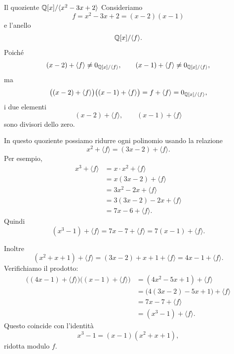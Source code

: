 \documentclass[a4paper]{article}
\begin{document}
\begin{radioactive}
\begin{snippetexample}{Il quoziente \(\mathbb{Q}[x]/\langle x^2-3x+2 \rangle\)}
    Consideriamo
    \[
        f=x^2-3x+2=(x-2)(x-1)
    \]
    e l'anello
    \[
        \mathbb{Q}[x]/\langle f \rangle.
    \]
    Poiché
    \[
        (x-2)+\langle f \rangle\neq 0_{\mathbb{Q}[x]/\langle f \rangle},
        \qquad
        (x-1)+\langle f \rangle\neq 0_{\mathbb{Q}[x]/\langle f \rangle},
    \]
    ma
    \[
        \big((x-2)+\langle f \rangle\big)\big((x-1)+\langle f \rangle\big)
        =
        f+\langle f \rangle
        =
        0_{\mathbb{Q}[x]/\langle f \rangle},
    \]
    i due elementi
    \[
        (x-2)+\langle f \rangle,
        \qquad
        (x-1)+\langle f \rangle
    \]
    sono divisori dello zero.

    In questo quoziente possiamo ridurre ogni polinomio usando la relazione
    \[
        x^2+\langle f \rangle=(3x-2)+\langle f \rangle.
    \]
    Per esempio,
    \begin{align*}
        x^3+\langle f \rangle
        &=
        x\cdot x^2+\langle f \rangle \\
        &=
        x(3x-2)+\langle f \rangle \\
        &=
        3x^2-2x+\langle f \rangle \\
        &=
        3(3x-2)-2x+\langle f \rangle \\
        &=
        7x-6+\langle f \rangle.
    \end{align*}
    Quindi
    \[
        (x^3-1)+\langle f \rangle=7x-7+\langle f \rangle=7(x-1)+\langle f \rangle.
    \]

    Inoltre
    \[
        (x^2+x+1)+\langle f \rangle
        =
        (3x-2)+x+1+\langle f \rangle
        =
        4x-1+\langle f \rangle.
    \]
    Verifichiamo il prodotto:
    \begin{align*}
        \big((4x-1)+\langle f \rangle\big)\big((x-1)+\langle f \rangle\big)
        &=
        (4x^2-5x+1)+\langle f \rangle \\
        &=
        \big(4(3x-2)-5x+1\big)+\langle f \rangle \\
        &=
        7x-7+\langle f \rangle \\
        &=
        (x^3-1)+\langle f \rangle.
    \end{align*}
    Questo coincide con l'identità
    \[
        x^3-1=(x-1)(x^2+x+1),
    \]
    ridotta modulo \(f\).
\end{snippetexample}
\end{radioactive}
\end{document}
